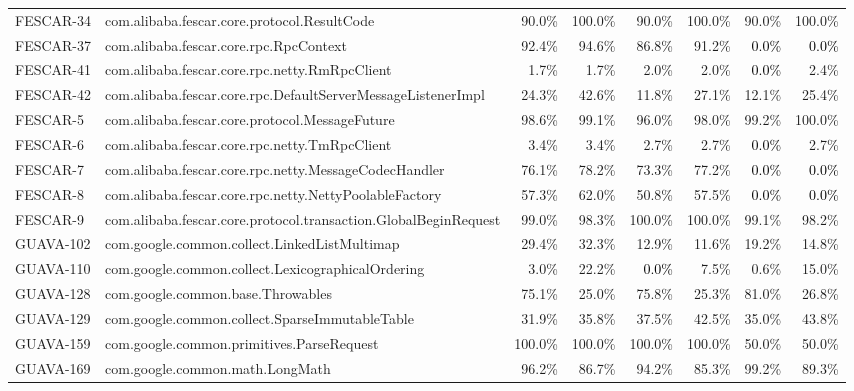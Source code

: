 \begin{tabular}{ ll rr rr rr}
FESCAR-34  &  com.alibaba.fescar.core.protocol.ResultCode & 90.0\% & 100.0\% & 90.0\% & 100.0\% & 90.0\% & 100.0\%\\ 
FESCAR-37  &  com.alibaba.fescar.core.rpc.RpcContext & 92.4\% & 94.6\% & 86.8\% & 91.2\% & \cellcolor{light-gray} \textcolor{black}{0.0\%} & \cellcolor{light-gray} \textcolor{black}{0.0\%}\\ 
FESCAR-41  &  com.alibaba.fescar.core.rpc.netty.RmRpcClient & 1.7\% & 1.7\% & 2.0\% & 2.0\% & \cellcolor{light-gray} \textcolor{black}{0.0\%} & 2.4\%\\ 
FESCAR-42  &  com.alibaba.fescar.core.rpc.DefaultServerMessageListenerImpl & 24.3\% & 42.6\% & 11.8\% & 27.1\% & 12.1\% & 25.4\%\\ 
FESCAR-5  &  com.alibaba.fescar.core.protocol.MessageFuture & 98.6\% & 99.1\% & 96.0\% & 98.0\% & 99.2\% & 100.0\%\\ 
FESCAR-6  &  com.alibaba.fescar.core.rpc.netty.TmRpcClient & 3.4\% & 3.4\% & 2.7\% & 2.7\% & \cellcolor{light-gray} \textcolor{black}{0.0\%} & 2.7\%\\ 
FESCAR-7  &  com.alibaba.fescar.core.rpc.netty.MessageCodecHandler & 76.1\% & 78.2\% & 73.3\% & 77.2\% & \cellcolor{light-gray} \textcolor{black}{0.0\%} & \cellcolor{light-gray} \textcolor{black}{0.0\%}\\ 
FESCAR-8  &  com.alibaba.fescar.core.rpc.netty.NettyPoolableFactory & 57.3\% & 62.0\% & 50.8\% & 57.5\% & \cellcolor{light-gray} \textcolor{black}{0.0\%} & \cellcolor{light-gray} \textcolor{black}{0.0\%}\\ 
FESCAR-9  &  com.alibaba.fescar.core.protocol.transaction.GlobalBeginRequest & 99.0\% & 98.3\% & 100.0\% & 100.0\% & 99.1\% & 98.2\%\\ 
GUAVA-102  &  com.google.common.collect.LinkedListMultimap & 29.4\% & 32.3\% & 12.9\% & 11.6\% & 19.2\% & 14.8\%\\ 
GUAVA-110  &  com.google.common.collect.LexicographicalOrdering & 3.0\% & 22.2\% & \cellcolor{light-gray} \textcolor{black}{0.0\%} & 7.5\% & 0.6\% & 15.0\%\\ 
GUAVA-128  &  com.google.common.base.Throwables & 75.1\% & 25.0\% & 75.8\% & 25.3\% & 81.0\% & 26.8\%\\ 
GUAVA-129  &  com.google.common.collect.SparseImmutableTable & 31.9\% & 35.8\% & 37.5\% & 42.5\% & 35.0\% & 43.8\%\\ 
GUAVA-159  &  com.google.common.primitives.ParseRequest & 100.0\% & 100.0\% & 100.0\% & 100.0\% & 50.0\% & 50.0\%\\ 
GUAVA-169  &  com.google.common.math.LongMath & 96.2\% & 86.7\% & 94.2\% & 85.3\% & 99.2\% & 89.3\%\\ 

\end{tabular}
